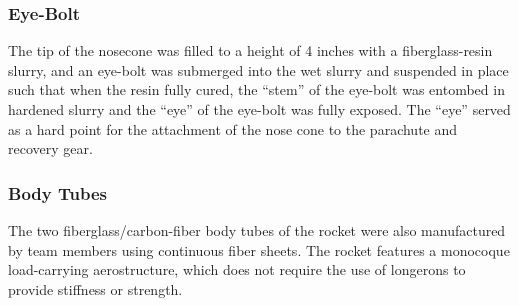 \subsubsection*{Eye-Bolt}
The tip of the nosecone was filled to a height of 4 inches with a fiberglass-resin slurry, and an eye-bolt was submerged into the wet slurry and suspended in place such that when the resin fully cured, the “stem” of the eye-bolt was entombed in hardened slurry and the “eye” of the eye-bolt was fully exposed. The “eye” served as a hard point for the attachment of the nose cone to the parachute and recovery gear.
\subsubsection{Body Tubes}
The two fiberglass/carbon-fiber body tubes of the rocket were also manufactured by team members using continuous fiber sheets. The rocket features a monocoque load-carrying aerostructure, which does not require the use of longerons to provide stiffness or strength.
